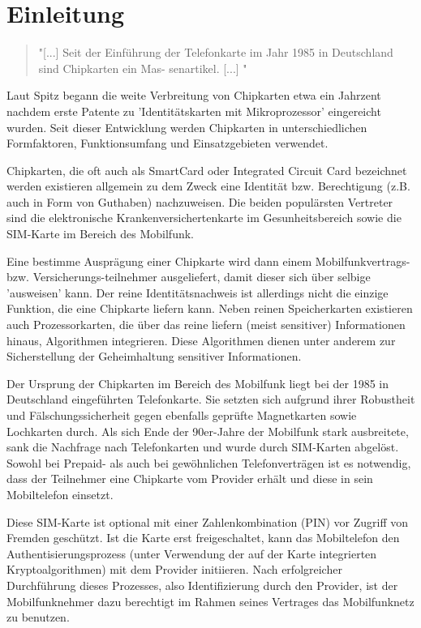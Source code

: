 \section{Einleitung}
\label{einleitung}
\begin{quote}
"[...] Seit der Einführung der Telefonkarte im Jahr 1985 in Deutschland sind Chipkarten ein Mas-
senartikel. [...] "\cite{spitz11}
\end{quote}

Laut Spitz begann die weite Verbreitung von Chipkarten etwa ein Jahrzent nachdem erste Patente
zu 'Identitätskarten mit Mikroprozessor' eingereicht wurden. Seit dieser Entwicklung
werden Chipkarten in unterschiedlichen Formfaktoren, Funktionsumfang und Einsatzgebieten
verwendet.

Chipkarten, die oft auch als SmartCard oder Integrated Circuit Card bezeichnet werden existieren
allgemein zu dem Zweck eine Identität bzw. Berechtigung (z.B. auch in Form von Guthaben) nachzuweisen.
Die beiden populärsten Vertreter sind die elektronische Krankenversichertenkarte im Gesunheitsbereich
sowie die \ac{SIM}-Karte im Bereich des Mobilfunk.

Eine bestimme Ausprägung einer Chipkarte wird dann einem Mobilfunkvertrags- bzw. Versicherungs-teilnehmer
ausgeliefert, damit dieser sich über selbige 'ausweisen' kann. Der reine Identitätsnachweis ist
allerdings nicht die einzige Funktion, die eine Chipkarte liefern kann. Neben reinen Speicherkarten
existieren auch Prozessorkarten, die über das reine liefern (meist sensitiver) Informationen hinaus,
Algorithmen integrieren. Diese Algorithmen dienen unter anderem zur Sicherstellung der Geheimhaltung
sensitiver Informationen.

Der Ursprung der Chipkarten im Bereich des Mobilfunk liegt bei der 1985 in Deutschland eingeführten
Telefonkarte. Sie setzten sich aufgrund ihrer Robustheit und Fälschungssicherheit gegen ebenfalls
geprüfte Magnetkarten sowie Lochkarten durch. Als sich Ende der 90er-Jahre der Mobilfunk stark
ausbreitete, sank die Nachfrage nach Telefonkarten und wurde durch \ac{SIM}-Karten abgelöst.
Sowohl bei Prepaid- als auch bei gewöhnlichen Telefonverträgen ist es notwendig, dass der Teilnehmer
eine Chipkarte vom Provider erhält und diese in sein Mobiltelefon einsetzt.

Diese \ac{SIM}-Karte ist optional mit einer Zahlenkombination (\ac{PIN}) vor Zugriff von Fremden geschützt.
Ist die Karte erst freigeschaltet, kann das Mobiltelefon den Authentisierungsprozess (unter Verwendung der
auf der Karte integrierten Kryptoalgorithmen) mit dem Provider initiieren. Nach erfolgreicher Durchführung
dieses Prozesses, also Identifizierung durch den Provider, ist der Mobilfunknehmer dazu berechtigt
im Rahmen seines Vertrages das Mobilfunknetz zu benutzen.

